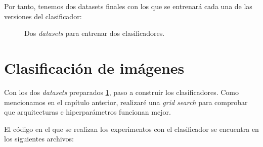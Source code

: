 Por tanto, tenemos dos datasets finales con los que se entrenará cada una de las versiones del clasificador:
\begin{figure}[H]
\centering
    \caption{Dos \textit{datasets} para entrenar dos clasificadores.} 
    \label{fig:two_final_datasets}
\end{figure}

\newpage
\section{Clasificación de imágenes}

Con los dos \textit{datasets} preparados \ref{fig:two_final_datasets}, paso a construir los clasificadores. Como mencionamos en el capítulo anterior, realizaré una \textit{grid search} para comprobar que arquitecturas e hiperparámetros funcionan mejor.

El código en el que se realizan los experimentos con el clasificador se encuentra en los siguientes archivos:

\vspace{0.2cm}

